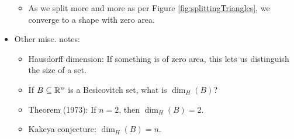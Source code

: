 \documentclass[../apprentice.tex]{subfiles}
\begin{document}
\begin{itemize}
    \begin{itemize}
        \item As we split more and more as per Figure \ref{fig:splittingTriangles}, we converge to a shape with zero area.
    \end{itemize}
    \item Other misc. notes:
    \begin{itemize}
        \item Hausdorff dimension: If something is of zero area, this lets us distinguish the size of a set.
        \item If $B\subseteq\mathbb{R}^n$ is a Besicovitch set, what is $\dim_H(B)$?
        \item Theorem (1973): If $n=2$, then $\dim_H(B)=2$.
        \item Kakeya conjecture: $\dim_H(B)=n$.
    \end{itemize}
\end{itemize}
\end{document}
